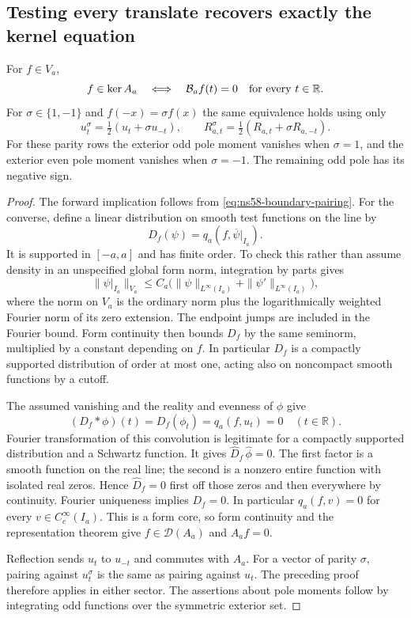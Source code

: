 \subsection*{Testing every translate recovers exactly the kernel equation}

\begin{proposition}
\label{prop:ns58-equivalence}
For $f\in V_a$,
\begin{equation}\label{eq:ns58-equivalence}
 f\in\ker A_a
 \quad\Longleftrightarrow\quad
 \mathcal B_a f(t)=0\quad\hbox{for every }t\in\mathbb R.
\end{equation}
For $\sigma\in\{1,-1\}$ and $f(-x)=\sigma f(x)$ the same
equivalence holds using only
\[
 u_t^\sigma=\tfrac12(u_t+\sigma u_{-t}),\qquad
 R_{a,t}^\sigma=\tfrac12(R_{a,t}+\sigma R_{a,-t}).
\]
For these parity rows the exterior odd pole moment vanishes when
$\sigma=1$, and the exterior even pole moment vanishes when
$\sigma=-1$. The remaining odd pole has its negative sign.
\end{proposition}
\begin{proof}
The forward implication follows from
\eqref{eq:ns58-boundary-pairing}. For the converse, define a linear
distribution on smooth test functions on the line by
\[
 D_f(\psi)=q_a(f,\overline{\psi}|_{I_a}).
\]
It is supported in $[-a,a]$ and has finite order. To check this rather
than assume density in an unspecified global form norm, integration
by parts gives
\[
 \|\psi|_{I_a}\|_{V_a}
 \le C_a\bigl(\|\psi\|_{L^\infty(I_a)}
                +\|\psi'\|_{L^\infty(I_a)}\bigr),
\]
where the norm on $V_a$ is the ordinary norm plus the logarithmically
weighted Fourier norm of its zero extension. The endpoint jumps are
included in the Fourier bound. Form continuity then bounds $D_f$
by the same seminorm, multiplied by a constant depending on $f$.
In particular $D_f$ is a compactly supported distribution of order
at most one, acting also on noncompact smooth functions by a cutoff.

The assumed vanishing and the reality and evenness of $\phi$ give
\[
 (D_f*\phi)(t)=D_f(\phi_t)=q_a(f,u_t)=0\quad(t\in\mathbb R).
\]
Fourier transformation of this convolution is legitimate for a
compactly supported distribution and a Schwartz function. It gives
$\widehat D_f\,\widehat\phi=0$. The first factor is a smooth
function on the real line; the second is a nonzero entire function
with isolated real zeros. Hence $\widehat D_f=0$ first off those
zeros and then everywhere by continuity. Fourier uniqueness implies
$D_f=0$. In particular $q_a(f,v)=0$ for every
$v\in C_c^\infty(I_a)$. This is a form core, so form continuity
and the representation theorem give $f\in\mathcal D(A_a)$ and
$A_af=0$.

Reflection sends $u_t$ to $u_{-t}$ and commutes with $A_a$.
For a vector of parity $\sigma$, pairing against $u_t^\sigma$
is the same as pairing against $u_t$. The preceding proof therefore
applies in either sector. The assertions about pole moments follow
by integrating odd functions over the symmetric exterior set.
\end{proof}

